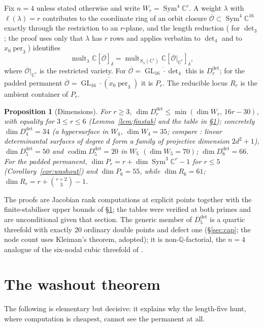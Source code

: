 \documentclass[11pt]{amsart}
\theoremstyle{plain}
\newtheorem{proposition}[theorem]{Proposition}
\theoremstyle{definition}
\theoremstyle{remark}
\DeclareMathOperator{\GL}{GL}
\DeclareMathOperator{\Sym}{Sym}
\DeclareMathOperator{\mult}{mult}
\DeclareMathOperator{\per}{per}
\DeclareMathOperator{\codim}{codim}
\newcommand{\bC}{\mathbb{C}}
\newcommand{\bQ}{\mathbb{Q}}
\newcommand{\cO}{\overline{\mathcal{O}}}
\newcommand{\Rr}{R}
\newcommand{\Pp}{P}
\newcommand{\Ddet}{D^{\det}}
\begin{document}
Fix $n=4$ unless stated otherwise and write $W_r=\Sym^{4}\bC^{r}$.  A weight
$\lambda$ with $\ell(\lambda)=r$ contributes to the coordinate ring of an
orbit closure $\cO\subset\Sym^{4}\bC^{16}$ exactly through the restriction to
an $r$-plane, and the length reduction (\cite[Prop.~4.19]{Companion} for
$\det_3$; the proof uses only that $\lambda$ has $r$ rows and applies verbatim
to $\det_4$ and to $x_0\per_3$) identifies
\begin{equation}\label{eq:lengthred}
  \mult_\lambda\bC[\cO]_\delta=\mult_{S_\lambda(\bC^r)}\bC[\cO|_{\bC^r}]_\delta,
\end{equation}
where $\cO|_{\bC^r}$ is the restricted variety.  For $\cO=\overline{\GL_{16}\cdot\det_4}$
this is $\Ddet_r$; for the padded permanent $\cO=\overline{\GL_{16}\cdot(x_0\per_3)}$
it is $\Pp_r$.  The reducible locus $\Rr_r$ is the ambient container of $\Pp_r$.

\begin{proposition}[Dimensions]\label{prop:dims}
For $r\ge3$, $\dim\Ddet_r\le\min(\dim W_r,\,16r-30)$, with equality for
$3\le r\le6$ (Lemma~\ref{lem:finstab} and the table in \S\ref{sec:washout});
concretely $\dim\Ddet_4=34$ (a hypersurface in $W_4$, $\dim W_4=35$; compare
\cite[Cor.~3.1]{LLV}: linear determinantal surfaces of degree $d$ form a family
of projective dimension $2d^{2}+1$), $\dim\Ddet_5=50$ and $\codim\Ddet_5=20$ in
$W_5$ $(\dim W_5=70)$; $\dim\Ddet_6=66$.  For the padded permanent, $\dim\Pp_r=r+\dim\Sym^{3}\bC^{r}-1$
for $r\le5$ (Corollary~\ref{cor:washout}) and $\dim\Pp_6=55$, while
$\dim\Rr_6=61$; $\dim\Rr_r=r+\binom{r+2}{3}-1$.
\end{proposition}

The proofs are Jacobian rank computations at explicit points together with the
finite-stabiliser upper bounds of \S\ref{sec:washout}; the tables were verified
at both primes and are unconditional given that section.  The generic member of
$\Ddet_5$ is a quartic threefold with exactly $20$ ordinary double points and
defect one (\S\ref{sec:cap}; the node count uses Kleiman's theorem, adopted);
it is non-$\bQ$-factorial, the $n=4$ analogue of
the six-nodal cubic threefold of \cite{Companion}.

\section{The washout theorem}\label{sec:washout}

The following is elementary but decisive: it explains why the length-five hunt,
where computation is cheapest, cannot see the permanent at all.
\end{document}
